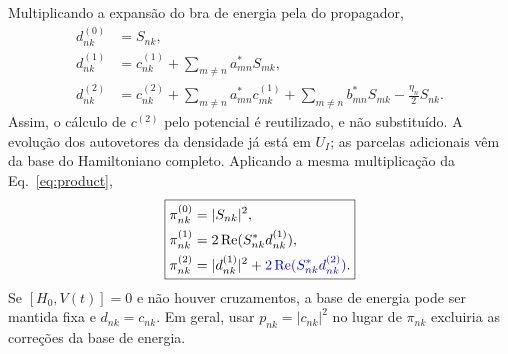 Multiplicando a expansão do bra de energia pela do propagador,
\begin{align}
 d_{nk}^{(0)}&=S_{nk},\nonumber\\
 d_{nk}^{(1)}&=c_{nk}^{(1)}
                  +\sum_{m\ne n}a_{mn}^*S_{mk},\nonumber\\
 d_{nk}^{(2)}&=c_{nk}^{(2)}
          +\sum_{m\ne n}a_{mn}^*c_{mk}^{(1)}
          +\sum_{m\ne n}b_{mn}^*S_{mk}
          -\frac{\eta_n}{2}S_{nk}.
 \label{eq:dcoeff}
\end{align}
Assim, o cálculo de $c^{(2)}$ pelo potencial é reutilizado, e não
substituído. A evolução dos autovetores da densidade já está em $U_I$;
as parcelas adicionais vêm da base do Hamiltoniano completo.
Aplicando a mesma multiplicação da Eq.~\eqref{eq:product},
\begin{equation}
 \boxed{\begin{aligned}
 \pi_{nk}^{(0)}&=|S_{nk}|^2,\\
 \pi_{nk}^{(1)}&=2\operatorname{Re}(S_{nk}^*d_{nk}^{(1)}),\\
 \pi_{nk}^{(2)}&=|d_{nk}^{(1)}|^2+
 \textcolor{blue}{2\operatorname{Re}(S_{nk}^*d_{nk}^{(2)})}.
 \end{aligned}}
 \label{eq:piphysical}
\end{equation}
Se $[H_0,V(t)]=0$ e não houver cruzamentos, a base de energia pode
ser mantida fixa e $d_{nk}=c_{nk}$.
Em geral, usar $p_{nk}=|c_{nk}|^2$ no lugar de $\pi_{nk}$ excluiria
as correções da base de energia.

